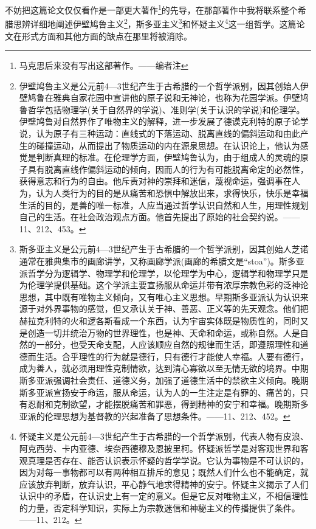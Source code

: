 \documentclass[a4paper,twoside,12pt,AutoFakeBold]{ctexart}
\begin{document}
不妨把这篇论文仅仅看作是一部更大著作\footnote{马克思后来没有写出这部著作。——编者注}的先导，在那部著作中我将联系整个希腊思辨详细地阐述伊壁鸠鲁主义\footnote{伊壁鸠鲁主义是公元前4—3世纪产生于古希腊的一个哲学派别，因其创始人伊壁鸠鲁在雅典自家花园中宣讲他的原子说和无神论，也称为花园学派。伊壁鸠鲁哲学包括物理学(关于自然界的学说)、准则学(关于认识的学说)和伦理学。伊壁鸠鲁对自然界作了唯物主义的解释，进一步发展了德谟克利特的原子论学说，认为原子有三种运动：直线式的下落运动、脱离直线的偏斜运动和由此产生的碰撞运动，从而提出了物质运动的内在源泉思想。在认识论上，他认为感觉是判断真理的标准。在伦理学方面，伊壁鸠鲁认为，由于组成人的灵魂的原子具有脱离直线作偏斜运动的倾向，因而人的行为有可能脱离命定的必然性，获得意志和行为的自由。他斥责对神的崇拜和迷信，蔑视命运，强调事在人为，认为人类行为的目的是从痛苦和恐惧中解放出来，求得快乐，快乐是幸福生活的目的，是善的唯一标准，人应当通过哲学认识自然和人生，用理性规划自己的生活。在社会政治观点方面。他首先提出了原始的社会契约说。——11、212、453。}，斯多亚主义\footnote{斯多亚主义是公元前4—3世纪产生于古希腊的一个哲学派别，因其创始人芝诺通常在雅典集市的画廊讲学，又称画廊学派(画廊的希腊文是“stoa”)。斯多亚派哲学分为逻辑学、物理学和伦理学，以伦理学为中心，逻辑学和物理学只是为伦理学提供基础。这个学派主要宣扬服从命运并带有浓厚宗教色彩的泛神论思想，其中既有唯物主义倾向，又有唯心主义思想。早期斯多亚派认为认识来源于对外界事物的感觉，但又承认关于神、善恶、正义等的先天观念。他们把赫拉克利特的火和逻各斯看成一个东西，认为宇宙实体既是物质性的，同时又是创造一切并统治万物的世界理性，也是神、天命和命运，或称自然。人是自然的一部分，也受天命支配，人应该顺应自然的规律而生活，即遵照理性和道德而生活。合乎理性的行为就是德行，只有德行才能使人幸福。人要有德行，成为善人，就必须用理性克制情欲，达到清心寡欲以至无情无欲的境界。中期斯多亚派强调社会责任、道德义务，加强了道德生活中的禁欲主义倾向。晚期斯多亚派宣扬安于命运，服从命运，认为人的一生注定是有罪的、痛苦的，只有忍耐和克制欲望，才能摆脱痛苦和罪恶，得到精神的安宁和幸福。晚期斯多亚派的伦理思想为基督教的兴起准备了思想条件。——11、212、452。}和怀疑主义\footnote{怀疑主义是公元前4—3世纪产生于古希腊的一个哲学派别，代表人物有皮浪、阿克西劳、卡内亚德、埃奈西德穆及恩披里柯。怀疑派哲学是对客观世界和客观真理是否存在、能否认识表示怀疑的哲学学说。它认为事物是不可认识的，因为对每一事物都可以有两种相互排斥的意见；既然人们什么也不能确定，就应该放弃判断，放弃认识，平心静气地求得精神的安宁。怀疑主义揭示了人们认识中的矛盾，在认识史上有一定的意义。但是它反对唯物主义，不相信理性的力量，否定科学知识，实际上为宗教迷信和神秘主义的传播提供了条件。——11、212。}这一组哲学。这篇论文在形式方面和其他方面的缺点在那里将被消除。
\end{document}
